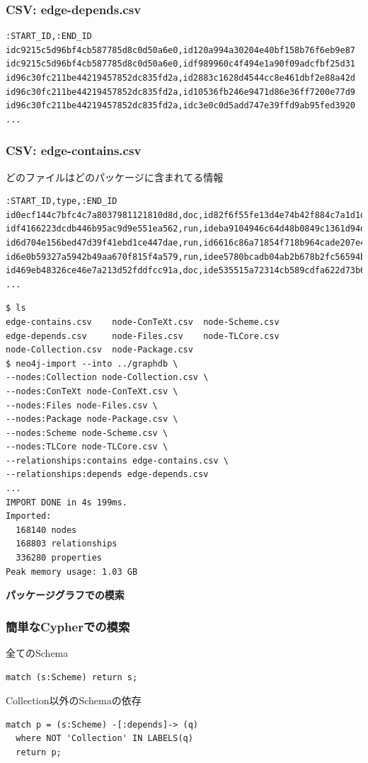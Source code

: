 \documentclass[hyperref]{beamer}
\newcommand{\cutin}[1]{%
  \begin{frame}[c]
    \begin{center}
      {\Large\bf\usebeamercolor[fg]{structure}#1}
    \end{center}
  \end{frame}
}
\begin{document}
\begin{frame}[fragile]
  \frametitle{CSV: edge-depends.csv}
  \begin{lstlisting}
:START_ID,:END_ID
idc9215c5d96bf4cb587785d8c0d50a6e0,id120a994a30204e40bf158b76f6eb9e87
idc9215c5d96bf4cb587785d8c0d50a6e0,idf989960c4f494e1a90f09adcfbf25d31
id96c30fc211be44219457852dc835fd2a,id2883c1628d4544cc8e461dbf2e88a42d
id96c30fc211be44219457852dc835fd2a,id10536fb246e9471d86e36ff7200e77d9
id96c30fc211be44219457852dc835fd2a,idc3e0c0d5add747e39ffd9ab95fed3920
...
\end{lstlisting}

\end{frame}


\begin{frame}[fragile]
  \frametitle{CSV: edge-contains.csv}
  どのファイルはどのパッケージに含まれてる情報
  \begin{lstlisting}
:START_ID,type,:END_ID
id0ecf144c7bfc4c7a8037981121810d8d,doc,id82f6f55fe13d4e74b42f884c7a1d1dc8
idf4166223dcdb446b95ac9d9e551ea562,run,ideba9104946c64d48b0849c1361d94dcc
id6d704e156bed47d39f41ebd1ce447dae,run,id6616c86a71854f718b964cade207e4bf
id6e0b59327a5942b49aa670f815f4a579,run,idee5780bcadb04ab2b678b2fc56594b85
id469eb48326ce46e7a213d52fddfcc91a,doc,ide535515a72314cb589cdfa622d73b6f6
...
\end{lstlisting}

\end{frame}

\begin{frame}
\begin{lstlisting}
$ ls
edge-contains.csv    node-ConTeXt.csv  node-Scheme.csv
edge-depends.csv     node-Files.csv    node-TLCore.csv
node-Collection.csv  node-Package.csv
$ neo4j-import --into ../graphdb \
--nodes:Collection node-Collection.csv \
--nodes:ConTeXt node-ConTeXt.csv \
--nodes:Files node-Files.csv \
--nodes:Package node-Package.csv \
--nodes:Scheme node-Scheme.csv \
--nodes:TLCore node-TLCore.csv \
--relationships:contains edge-contains.csv \
--relationships:depends edge-depends.csv
...
IMPORT DONE in 4s 199ms. 
Imported:
  168140 nodes
  168803 relationships
  336280 properties
Peak memory usage: 1.03 GB
\end{lstlisting}
\end{frame}
\cutin{パッケージグラフでの模索}

\begin{frame}[fragile]
  \frametitle{簡単なCypherでの模索}
  \pause
  全てのSchema
  \begin{lstlisting}
match (s:Scheme) return s;   
\end{lstlisting}

\pause
Collection以外のSchemaの依存
\begin{lstlisting}
match p = (s:Scheme) -[:depends]-> (q)
  where NOT 'Collection' IN LABELS(q)
  return p;
\end{lstlisting}
\end{frame}
\end{document}

